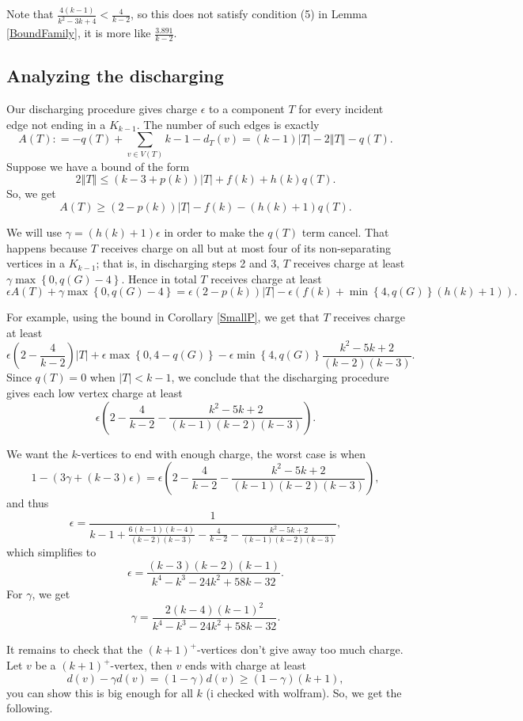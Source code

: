 \documentclass[12pt]{article}
\theoremstyle{plain}
\theoremstyle{definition}
\theoremstyle{remark}
\newcommand{\set}[1]{\left\{ #1 \right\}}
\newcommand{\card}[1]{\left|#1\right|}
\newcommand{\size}[1]{\left\Vert#1\right\Vert}
\newcommand{\parens}[1]{\left( #1 \right)}
\newcommand{\DefinedAs}{\mathrel{\mathop:}=}
\begin{document}
Note that $\frac{4(k-1)}{k^2 - 3k + 4} < \frac{4}{k-2}$, so this does not satisfy condition (5) in Lemma \ref{BoundFamily}, it is more like $\frac{3.891}{k-2}$.

\subsection{Analyzing the discharging}
Our discharging procedure gives charge $\epsilon$ to a component $T$ for every incident edge not ending in a $K_{k-1}$.  The number of such edges is exactly
\[A(T) \DefinedAs -q(T) + \sum_{v \in V(T)} k-1 - d_T(v) = (k-1)\card{T} - 2\size{T} - q(T).\]
Suppose we have a bound of the form
\[2\size{T} \le (k-3 + p(k))\card{T} + f(k) + h(k)q(T).\]
So, we get
\[A(T) \ge (2-p(k))\card{T} - f(k) - (h(k) + 1)q(T).\]

We will use $\gamma = (h(k) + 1)\epsilon$ in order to make the $q(T)$ term cancel.  That happens because $T$ receives charge on all but at most four of its non-separating vertices in a $K_{k-1}$; that is, in discharging steps 2 and 3, $T$ receives charge at least $\gamma\max\set{0, q(G) - 4}$.   Hence in total $T$ receives charge at least
\[\epsilon A(T) + \gamma\max\set{0, q(G) - 4} = \epsilon\parens{2-p(k)}\card{T} - \epsilon \parens{f(k) + \min\set{4, q(G)}(h(k) + 1)}.\]

For example, using the bound in Corollary \ref{SmallP}, we get that $T$ receives charge at least
\[\epsilon\parens{2-\frac{4}{k-2}}\card{T} + \epsilon\max\set{0, 4 - q(G)} - \epsilon\min\set{4, q(G)}\frac{k^2-5k+2}{(k-2)(k-3)}.\]
Since $q(T) = 0$ when $|T| < k - 1$, we conclude that the discharging procedure gives each low vertex charge at least
\[\epsilon\parens{2-\frac{4}{k-2} - \frac{k^2-5k+2}{(k-1)(k-2)(k-3)}}.\]

We want the $k$-vertices to end with enough charge, the worst case is when
\[1 - (3\gamma + (k-3)\epsilon) = \epsilon\parens{2-\frac{4}{k-2} - \frac{k^2-5k+2}{(k-1)(k-2)(k-3)}},\]
and thus
\[\epsilon = \frac{1}{k-1 + \frac{6(k-1)(k-4)}{(k-2)(k-3)} -\frac{4}{k-2} - \frac{k^2-5k+2}{(k-1)(k-2)(k-3)} },\]
which simplifies to
\[\epsilon = \frac{(k-3)(k-2)(k-1)}{k^4-k^3-24 k^2+58 k-32}.\]
For $\gamma$, we get
\[\gamma = \frac{2 (k-4) (k-1)^2}{k^4-k^3-24 k^2+58 k-32}.\]

It remains to check that the $(k+1)^+$-vertices don't give away too much charge.  Let $v$ be a $(k+1)^+$-vertex, then $v$ ends with charge at least
\[d(v) - \gamma d(v) = (1-\gamma)d(v) \ge (1-\gamma)(k+1),\]
you can show this is big enough for all $k$ (i checked with wolfram).  So, we get the following.
\end{document}
